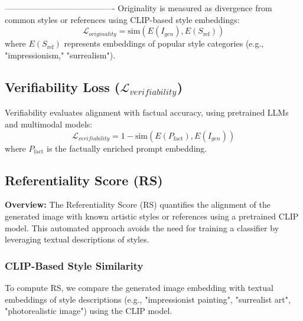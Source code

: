 ----------------------------------------
Originality is measured as divergence from common styles or references using CLIP-based style embeddings:
\begin{equation}
    \mathcal{L}_{originality} = \text{sim}(E(I_{gen}), E(S_{\text{ref}}))
\end{equation}
where $E(S_{\text{ref}})$ represents embeddings of popular style categories (e.g., "impressionism," "surrealism").

\subsection{Verifiability Loss ($\mathcal{L}_{verifiability}$)}
Verifiability evaluates alignment with factual accuracy, using pretrained LLMs and multimodal models:
\begin{equation}
    \mathcal{L}_{verifiability} = 1 - \text{sim}(E(P_{\text{fact}}), E(I_{gen}))
\end{equation}
where $P_{\text{fact}}$ is the factually enriched prompt embedding.

\subsection{Referentiality Score (RS)}
\label{subsec:referentiality_score}

\textbf{Overview:} The Referentiality Score (RS) quantifies the alignment of the generated image with known artistic styles or references using a pretrained CLIP model. This automated approach avoids the need for training a classifier by leveraging textual descriptions of styles.

\subsubsection{CLIP-Based Style Similarity}
To compute RS, we compare the generated image embedding with textual embeddings of style descriptions (e.g., "impressionist painting", "surrealist art", "photorealistic image") using the CLIP model.

